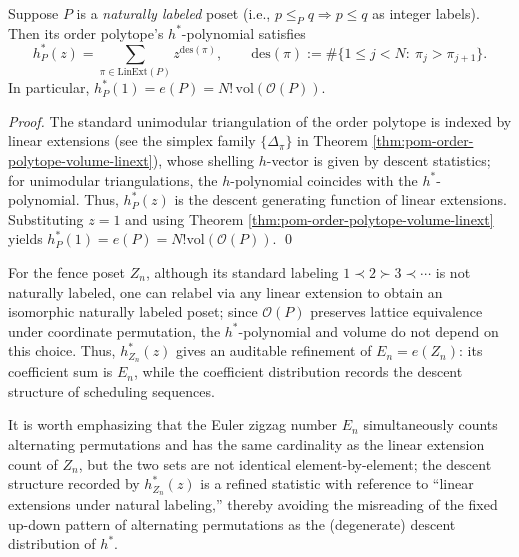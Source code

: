 \begin{theorem}\label{thm:pom-hstar-descent-linext}
Suppose \(P\) is a \emph{naturally labeled} poset (i.e., \(p\le_P q \Rightarrow p\le q\) as integer labels).
Then its order polytope's \(h^*\)-polynomial satisfies
\[
h_P^*(z)=\sum_{\pi\in\mathrm{LinExt}(P)} z^{\mathrm{des}(\pi)},
\qquad
\mathrm{des}(\pi):=\#\{1\le j<N:\ \pi_j>\pi_{j+1}\}.
\]
In particular, \(h_P^*(1)=e(P)=N!\,\mathrm{vol}(\mathcal O(P))\).
\end{theorem}
\begin{proof}
The standard unimodular triangulation of the order polytope is indexed by linear extensions (see the simplex family \(\{\Delta_\pi\}\) in Theorem \ref{thm:pom-order-polytope-volume-linext}),
whose shelling \(h\)-vector is given by descent statistics; for unimodular triangulations, the \(h\)-polynomial coincides with the \(h^*\)-polynomial.
Thus, \(h_P^*(z)\) is the descent generating function of linear extensions.
Substituting \(z=1\) and using Theorem \ref{thm:pom-order-polytope-volume-linext} yields \(h_P^*(1)=e(P)=N!\mathrm{vol}(\mathcal O(P))\). \qed
\end{proof}

\begin{remark}\label{rem:pom-fence-hstar-refinement}
For the fence poset \(Z_n\), although its standard labeling \(1\prec 2\succ 3\prec\cdots\) is not naturally labeled, one can relabel via any linear extension to obtain an isomorphic naturally labeled poset;
since \(\mathcal O(P)\) preserves lattice equivalence under coordinate permutation, the \(h^*\)-polynomial and volume do not depend on this choice.
Thus, \(h_{Z_n}^*(z)\) gives an auditable refinement of \(E_n=e(Z_n)\): its coefficient sum is \(E_n\), while the coefficient distribution records the descent structure of scheduling sequences.
\par
It is worth emphasizing that the Euler zigzag number \(E_n\) simultaneously counts alternating permutations and has the same cardinality as the linear extension count of \(Z_n\),
but the two sets are not identical element-by-element; the descent structure recorded by \(h_{Z_n}^*(z)\) is a refined statistic with reference to ``linear extensions under natural labeling,''
thereby avoiding the misreading of the fixed up-down pattern of alternating permutations as the (degenerate) descent distribution of \(h^*\).
\end{remark}


